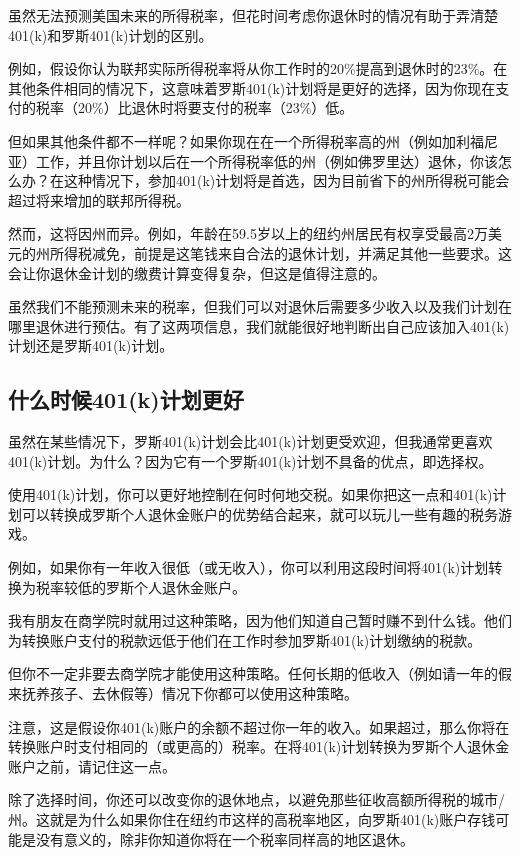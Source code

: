 虽然无法预测美国未来的所得税率，但花时间考虑你退休时的情况有助于弄清楚401(k)和罗斯401(k)计划的区别。

例如，假设你认为联邦实际所得税率将从你工作时的20\%提高到退休时的23\%。在其他条件相同的情况下，这意味着罗斯401(k)计划将是更好的选择，因为你现在支付的税率（20\%）比退休时将要支付的税率（23\%）低。

但如果其他条件都不一样呢？如果你现在在一个所得税率高的州（例如加利福尼亚）工作，并且你计划以后在一个所得税率低的州（例如佛罗里达）退休，你该怎么办？在这种情况下，参加401(k)计划将是首选，因为目前省下的州所得税可能会超过将来增加的联邦所得税。

然而，这将因州而异。例如，年龄在59.5岁以上的纽约州居民有权享受最高2万美元的州所得税减免，前提是这笔钱来自合法的退休计划，并满足其他一些要求。这会让你退休金计划的缴费计算变得复杂，但这是值得注意的。

虽然我们不能预测未来的税率，但我们可以对退休后需要多少收入以及我们计划在哪里退休进行预估。有了这两项信息，我们就能很好地判断出自己应该加入401(k)计划还是罗斯401(k)计划。

\subsection{什么时候401(k)计划更好}

虽然在某些情况下，罗斯401(k)计划会比401(k)计划更受欢迎，但我通常更喜欢401(k)计划。为什么？因为它有一个罗斯401(k)计划不具备的优点，即选择权。

使用401(k)计划，你可以更好地控制在何时何地交税。如果你把这一点和401(k)计划可以转换成罗斯个人退休金账户的优势结合起来，就可以玩儿一些有趣的税务游戏。

例如，如果你有一年收入很低（或无收入），你可以利用这段时间将401(k)计划转换为税率较低的罗斯个人退休金账户。

我有朋友在商学院时就用过这种策略，因为他们知道自己暂时赚不到什么钱。他们为转换账户支付的税款远低于他们在工作时参加罗斯401(k)计划缴纳的税款。

但你不一定非要去商学院才能使用这种策略。任何长期的低收入（例如请一年的假来抚养孩子、去休假等）情况下你都可以使用这种策略。

注意，这是假设你401(k)账户的余额不超过你一年的收入。如果超过，那么你将在转换账户时支付相同的（或更高的）税率。在将401(k)计划转换为罗斯个人退休金账户之前，请记住这一点。

除了选择时间，你还可以改变你的退休地点，以避免那些征收高额所得税的城市/州。这就是为什么如果你住在纽约市这样的高税率地区，向罗斯401(k)账户存钱可能是没有意义的，除非你知道你将在一个税率同样高的地区退休。

